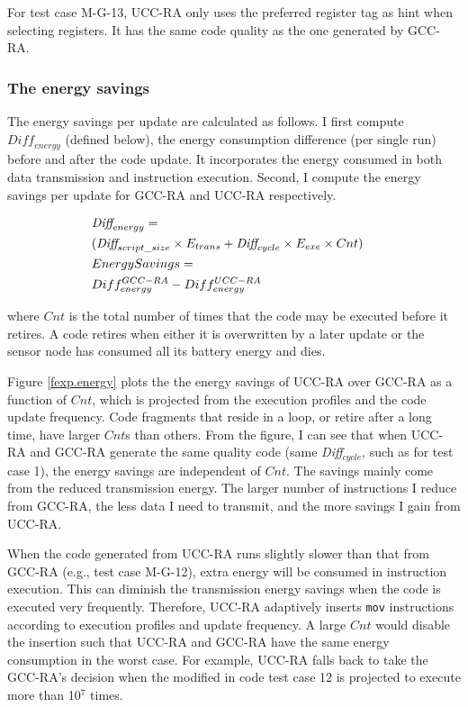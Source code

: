 For test case M-G-13, UCC-RA only uses the preferred register tag as hint
when selecting registers. It has the same code quality as the one
generated by GCC-RA.

\subsubsection{The energy savings}
The energy savings per update are calculated as follows. I first
compute $\textit{Diff}_{energy}$ (defined below), the energy consumption
difference (per single run) before and after the code update. It
incorporates the energy consumed in both data transmission and
instruction execution. Second, I compute the energy savings per
update for GCC-RA and UCC-RA respectively.

\begin{small}
\begin{eqnarray}
\lefteqn{\textit{Diff}_{energy} =}  \nonumber \\
& (\textit{Diff}_{script\_size} \times E_{trans} + \textit{Diff}_{cycle} \times E_{exe} \times Cnt) \\
\lefteqn{Energy Savings =} \nonumber \\
& Diff_{energy}^{GCC-RA} - Diff_{energy}^{UCC-RA}
\end{eqnarray}
\end{small}

\noindent
where $Cnt$ is the total number of times that the code may be executed
before it retires. A code retires when either it is overwritten by
a later update or the sensor node has consumed all its battery energy
and dies.

Figure \ref{fexp.energy} plots the the energy savings of UCC-RA over
GCC-RA as a function of $Cnt$, which is projected from the execution
profiles and the code update frequency. Code fragments that reside in
a loop, or retire after a long time, have larger $Cnt$s than
others. From the figure, I can see that when UCC-RA and GCC-RA
generate the same quality code (same \textit{Diff$_{cycle}$}, such as for test
case 1), the energy savings are independent of $Cnt$. The savings
mainly come from the reduced transmission energy. The larger number
of instructions I reduce from GCC-RA, the less data I need to
transmit, and the more savings I gain from UCC-RA.

When the code generated from UCC-RA runs slightly slower than that from GCC-RA (e.g., test case M-G-12), extra energy will be consumed in instruction execution. This can diminish the transmission energy savings when the code is executed very frequently. Therefore, UCC-RA adaptively inserts {\tt mov} instructions according to execution profiles and update frequency. A large $Cnt$ would disable the insertion such that UCC-RA and GCC-RA have the same energy consumption in the worst case. For example, UCC-RA falls back to take the GCC-RA's decision when the modified in code test case 12 is projected to execute more than 10$^7$ times.

